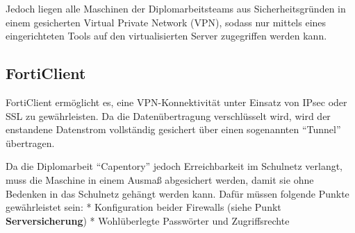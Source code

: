 Jedoch liegen alle Maschinen der Diplomarbeitsteams aus
Sicherheitsgründen in einem gesicherten Virtual Private Network (VPN),
sodass nur mittels eines eingerichteten Tools auf den virtualisierten
Server zugegriffen werden kann.

\hypertarget{forticlient}{%
\subsection{FortiClient}\label{forticlient}}

FortiClient ermöglicht es, eine VPN-Konnektivität unter Einsatz von
IPsec oder SSL zu gewährleisten. Da die Datenübertragung verschlüsselt
wird, wird der enstandene Datenstrom vollständig gesichert über einen
sogenannten ``Tunnel'' übertragen.

Da die Diplomarbeit ``Capentory'' jedoch Erreichbarkeit im Schulnetz
verlangt, muss die Maschine in einem Ausmaß abgesichert werden, damit
sie ohne Bedenken in das Schulnetz gehängt werden kann. Dafür müssen
folgende Punkte gewährleistet sein: * Konfiguration beider Firewalls
(siehe Punkt \textbf{Serversicherung}) * Wohlüberlegte Passwörter und
Zugriffsrechte
